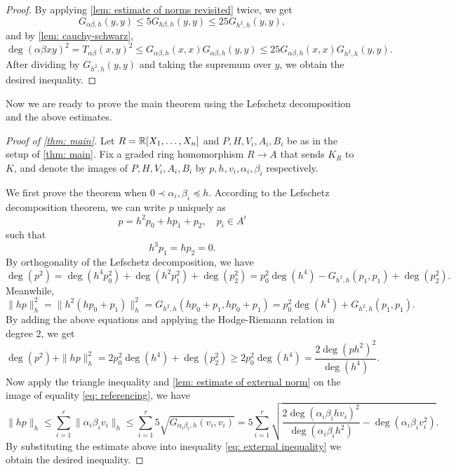 \begin{proof}
    By applying \cref{lem: estimate of norms revisited} twice, we get
    \[
        G_{\alpha\beta,h}(y,y)\leq 5G_{h\beta,h}(y,y)\leq 25 G_{h^2,h}(y,y),
    \]
    and by \cref{lem: cauchy-schwarz},
    \[
        \deg(\alpha\beta x y)^2=T_{\alpha\beta}(x,y)^2\leq G_{\alpha\beta,h}(x,x)G_{\alpha\beta,h}(y,y)\leq 25 G_{\alpha\beta,h}(x,x)G_{h^2,h}(y,y).
    \]
    After dividing by $G_{h^2,h}(y,y)$ and taking the supremum over $y$, we obtain the desired inequality.
\end{proof}

Now we are ready to prove the main theorem using the Lefschetz decomposition and the above estimates.
\begin{proof}[Proof of \cref{thm: main}]
Let $R=\mathbb{R}[X_1,\ldots,X_n]$ and $P, H, V_i, A_i, B_i$ be as in the setup of \cref{thm: main}. Fix a graded ring homomorphism $R\to A$ that sends $K_R$ to $K$, and denote the images of $P,H,V_i,A_i,B_i$ by $p,h,v_i,\alpha_i,\beta_i$ respectively.

We first prove the theorem when $0\prec \alpha_i,\beta_i\preceq h$. According to the Lefschetz decomposition theorem, we can write $p$ uniquely as
\[
    p=h^2p_0+hp_1+p_2, \quad p_i\in A^i
\]
such that
\[
    h^3p_1=hp_2=0.
\]
By orthogonality of the Lefschetz decomposition, we have
\[
    \deg(p^2)=\deg(h^4p_0^2)+\deg(h^2p_1^2)+\deg(p_2^2)=p_0^2\deg(h^4)-G_{h^2,h}(p_1,p_1)+\deg(p_2^2).
\]
Meanwhile,
\[
    \|hp\|_h^2=\|h^2(hp_0+p_1)\|_h^2=G_{h^2,h}(hp_0+p_1,hp_0+p_1)=p_0^2\deg(h^4)+G_{h^2,h}(p_1,p_1).
\]
By adding the above equations and applying the Hodge-Riemann relation in degree $2$, we get
\[
    \deg(p^2)+\|hp\|_h^2=2p_0^2\deg(h^4)+\deg(p_2^2)\geq 2p_0^2\deg(h^4)=\frac{2\deg(ph^2)^2}{\deg(h^4)}.\tag{2}\label{eq: external inequality}
\]
Now apply the triangle inequality and \cref{lem: estimate of external norm} on the image of equality \eqref{eq: referencing}, we have
\[
    \|hp\|_h\leq \sum_{i=1}^r\|\alpha_i\beta_iv_i\|_h\leq\sum_{i=1}^r 5\sqrt {G_{\alpha_i\beta_i,h}(v_i,v_i)}=5\sum_{i=1}^r\sqrt{\frac{2\deg(\alpha_i\beta_ihv_i)^2}{\deg(\alpha_i\beta_ih^2)}-\deg(\alpha_i\beta_iv_i^2)}.
\]
By substituting the estimate above into inequality \eqref{eq: external inequality} we obtain the desired inequality.


\end{proof}
